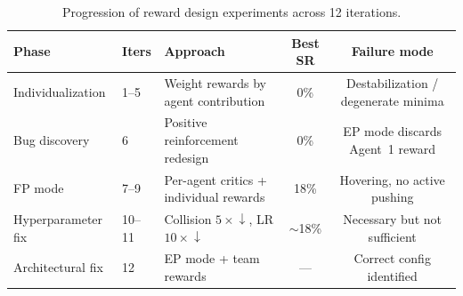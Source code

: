 \begin{table}[H]
  \centering
  \caption{Progression of reward design experiments across 12 iterations.}
  \label{tab:reward_design_progression}
  \begin{tabular}{llp{5cm}cc}
    \toprule
    \textbf{Phase} & \textbf{Iters} & \textbf{Approach} & \textbf{Best SR} & \textbf{Failure mode} \\
    \midrule
    Individualization     & 1--5   & Weight rewards by agent contribution     & 0\%    & Destabilization / degenerate minima \\
    Bug discovery         & 6      & Positive reinforcement redesign          & 0\%    & EP mode discards Agent~1 reward \\
    FP mode               & 7--9   & Per-agent critics + individual rewards   & 18\%   & Hovering, no active pushing \\
    Hyperparameter fix    & 10--11 & Collision $5\times\!\downarrow$, LR $10\times\!\downarrow$ & $\sim$18\% & Necessary but not sufficient \\
    Architectural fix     & 12     & EP mode + team rewards                   & ---    & Correct config identified \\
    \bottomrule
  \end{tabular}
\end{table}
